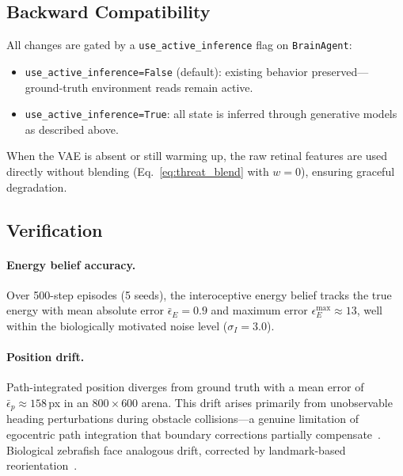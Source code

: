 \documentclass[11pt,a4paper]{article}
\begin{document}
\subsection{Backward Compatibility}\label{sec:backward_compat}

All changes are gated by a \texttt{use\_active\_inference} flag on
\texttt{BrainAgent}:
\begin{itemize}[nosep]
  \item \texttt{use\_active\_inference=False} (default): existing behavior
    preserved---ground-truth environment reads remain active.
  \item \texttt{use\_active\_inference=True}: all state is inferred
    through generative models as described above.
\end{itemize}
When the VAE is absent or still warming up, the raw retinal features are
used directly without blending (Eq.~\ref{eq:threat_blend} with $w=0$),
ensuring graceful degradation.

\subsection{Verification}\label{sec:ai_verification}

\paragraph{Energy belief accuracy.}
Over 500-step episodes (5 seeds), the interoceptive energy belief tracks
the true energy with mean absolute error $\bar{\epsilon}_E = 0.9$ and
maximum error $\epsilon_E^\text{max} \approx 13$, well within the
biologically motivated noise level ($\sigma_I = 3.0$).

\paragraph{Position drift.}
Path-integrated position diverges from ground truth with a mean error of
$\bar{\epsilon}_p \approx 158$\,px in an $800 \times 600$ arena.
This drift arises primarily from unobservable heading perturbations during
obstacle collisions---a genuine limitation of egocentric path integration
that boundary corrections partially compensate~\cite{etienne2004}.
Biological zebrafish face analogous drift, corrected by landmark-based
reorientation~\cite{moser2008}.
\end{document}
